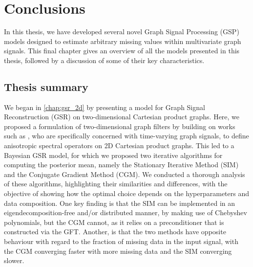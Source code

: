 \chapter{Conclusions} %

\label{chap:conclusions} %


In this thesis, we have developed several novel Graph Signal Processing (GSP) models designed to estimate arbitrary missing values within multivariate graph signals. This final chapter gives an overview of all the models presented in this thesis, followed by a discussion of some of their key characteristics.
\section{Thesis summary}

We began in \cref{chap:gsr_2d} by presenting a model for Graph Signal Reconstruction (GSR) on two-dimensional Cartesian product graphs. Here, we proposed a formulation of two-dimensional graph filters by building on works such as \cite{Ioannidis2016,Grassi2018,Isufi2017,Loukas2016}, who are specifically concerned with time-varying graph signals, to define anisotropic spectral operators on 2D Cartesian product graphs. This led to a Bayesian GSR model, for which we proposed two iterative algorithms for computing the posterior mean, namely the Stationary Iterative Method (SIM) and the Conjugate Gradient Method (CGM). We conducted a thorough analysis of these algorithms, highlighting their similarities and differences, with the objective of showing how the optimal choice depends on the hyperparameters and data composition. One key finding is that the SIM can be implemented in an eigendecomposition-free and/or distributed manner, by making use of Chebyshev polynomials, but the CGM cannot, as it relies on a preconditioner that is constructed via the GFT. Another, is that the two methods have opposite behaviour with regard to the fraction of missing data in the input signal, with the CGM converging faster with more missing data and the SIM converging slower. 

